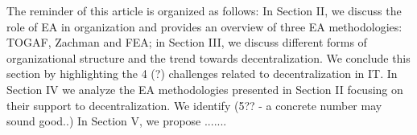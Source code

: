 The reminder of this article is organized as follows: In Section II, we discuss the role of EA in organization and provides an overview of three EA methodologies: TOGAF, Zachman  and  FEA;  in  Section  III,  we  discuss  different forms of organizational structure and the trend towards decentralization. We conclude this section by highlighting the 4 (?) challenges related to decentralization in IT. In Section IV we analyze the EA methodologies presented in Section II focusing on their support to decentralization. We identify (5?? - a concrete number may sound good..) In Section V, we propose .......

% 
% 
% 
% 
% 
% 
% 
% 
% 
% 
% 
% 
% 
% 
% 
% 
% 